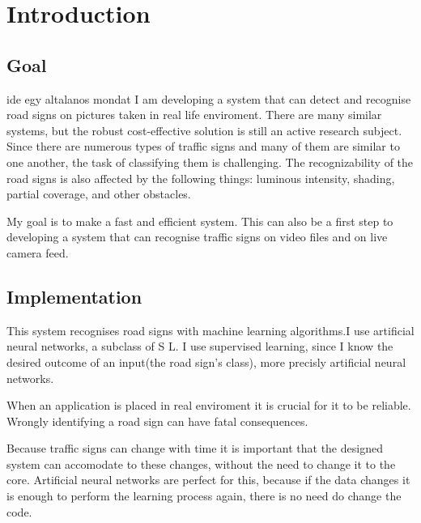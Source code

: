 \chapter{Introduction}\label{ch:INTRO}

\section{Goal}\label{sec:INTRO:goal}

 ide egy altalanos mondat I am developing a system that can detect and recognise road signs on pictures taken in real life enviroment. There are many similar systems, but the robust cost-effective solution is still an active research subject. Since there are numerous types of traffic signs and many of them are similar to one another, the task of classifying them is challenging. The recognizability of the road signs is also affected by the following things: luminous intensity, shading, partial coverage, and other obstacles.

My goal is to make a fast and efficient system. This can also be a first step to developing a system that can recognise traffic signs on video files and on live camera feed.

\section{Implementation}\label{sec:INTRO:implement}

This system recognises road signs with machine learning algorithms.I use artificial neural networks, a subclass of S L. I use supervised learning, since I know the desired outcome of an input(the road sign's class), more precisly artificial neural networks.

When an application is placed in real enviroment it is crucial for it to be reliable. Wrongly identifying a road sign can have fatal consequences.

Because traffic signs can change with time it is important that the designed system can accomodate to these changes, without the need to change it to the core. Artificial neural networks are perfect for this, because if the data changes it is enough to perform the learning process again, there is no need do change the code.